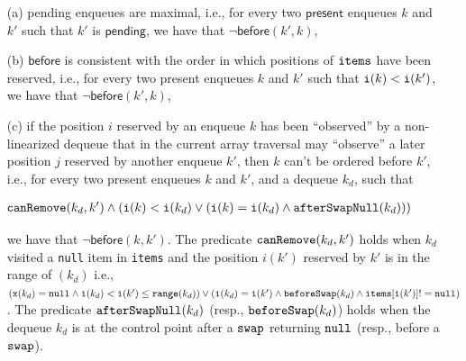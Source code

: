 \begin{itemize}
	\item[(a)] pending enqueues are maximal, i.e., for every two $\mathsf{present}$ enqueues $k$ and $k'$ such that $k'$ is $\mathsf{pending}$, we have that $\neg \mathsf{before}(k',k)$, %
	\item[(b)] $\mathsf{before}$ is consistent with the order in which positions of ${\tt items}$ have been reserved, i.e., for every two present enqueues $k$ and $k'$ such that ${\tt i}(k) < {\tt i}(k')$, we have that $\neg \mathsf{before}(k',k)$, %
	\item[(c)] if the position $i$ reserved by an enqueue $k$ has been ``observed'' by a non-linearized dequeue that in the current array traversal may ``observe'' a later position $j$ reserved by another enqueue $k'$, then $k$ can't be ordered before $k'$,
	i.e., for every two present enqueues $k$ and $k'$, and a dequeue $k_d$, such that

	\vspace{-2mm}
	\noindent
	{\small
	\begin{align}
	\hspace{-8mm}
	{\tt canRemove}(k_d,k') \land ({\tt i}(k) < {\tt i}(k_d) \lor ({\tt i}(k)={\tt i}(k_d) \land {\tt afterSwapNull}(k_d)))
\label{eq:inst}
	\end{align}}

	\vspace{-6mm}
	\noindent
	we have that $\neg \mathsf{before}(k,k')$. The predicate ${\tt canRemove}(k_d,k')$ holds when $k_d$ visited a {\tt null} item in {\tt items} and the position $i(k')$ reserved by $k'$ is in the range of $(k_d)$ i.e., $({\tt x}(k_d) = {\tt null} \land {\tt i}(k_d) < {\tt i}(k') \leq {\tt range}(k_d)) \lor ({\tt i}(k_d) = {\tt i}(k') \land {\tt beforeSwap}(k_d) \land {\tt items}[{\tt i}(k')] != {\tt null})$. The predicate ${\tt afterSwapNull}(k_d)$ (resp., ${\tt beforeSwap}(k_d)$) holds when the dequeue $k_d$ is at the control point after a ${\tt swap}$ returning ${\tt null}$ (resp., before a ${\tt swap}$).
\vspace{-2mm}
\end{itemize}
